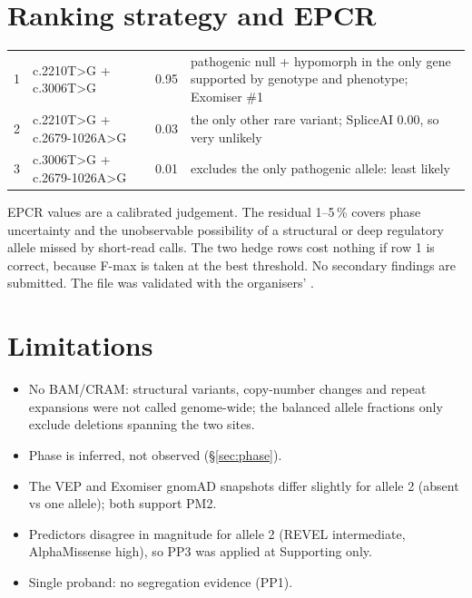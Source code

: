 \documentclass[10pt]{article}
\begin{document}
\section{Ranking strategy and EPCR}
\begin{table}[H]\tablefont
\begin{tabularx}{\linewidth}{@{}P{0.5cm}P{4.3cm}P{1.0cm}L@{}}
\toprule{} &  &  & \\ & c.2210T>G + c.3006T>G & 0.95 & pathogenic null + hypomorph in the only gene supported by genotype and phenotype; Exomiser \#1\\
2 & c.2210T>G + c.2679-1026A>G & 0.03 & the only other rare  variant; SpliceAI 0.00, so very unlikely\\
3 & c.3006T>G + c.2679-1026A>G & 0.01 & excludes the only pathogenic allele: least likely\\\bottomrule
\end{tabularx}\end{table}
EPCR values are a calibrated judgement. The residual 1–5\,\% covers phase uncertainty and the unobservable
possibility of a structural or deep regulatory allele missed by short-read calls. The two hedge rows cost nothing
if row 1 is correct, because F-max is taken at the best threshold. No secondary findings are submitted. The file was
validated with the organisers' .

\section{Limitations}
\begin{itemize}
\item No BAM/CRAM: structural variants, copy-number changes and repeat expansions were not called genome-wide; the
  balanced allele fractions only exclude deletions spanning the two sites.
\item Phase is inferred, not observed (§\ref{sec:phase}).
\item The VEP and Exomiser gnomAD snapshots differ slightly for allele 2 (absent vs one allele); both support PM2.
\item Predictors disagree in magnitude for allele 2 (REVEL intermediate, AlphaMissense high), so PP3 was applied at
  Supporting only.
\item Single proband: no segregation evidence (PP1).
\end{itemize}
\end{document}
